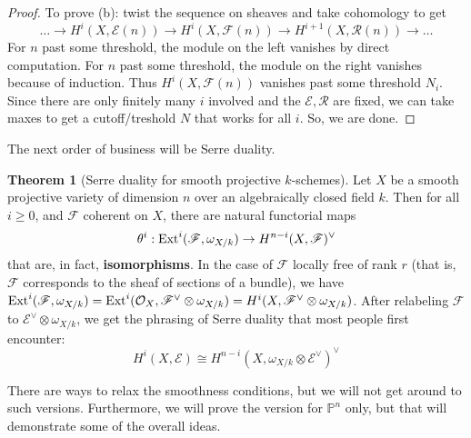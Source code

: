 \documentclass[10pt,reqno]{amsart}
\theoremstyle{definition}
\newtheorem{theorem}{Theorem}
\theoremstyle{remark}
\numberwithin{equation}{section}
\numberwithin{theorem}{section}
\newcommand{\OO}{{\mathcal O}}
\newcommand{\Ext}{\textup{Ext}}
\newcommand{\FF}{{\mathscr F}}
\newcommand{\EE}{{\mathscr E}}
\newcommand{\RR}{{\mathscr R}}
\newcommand{\PP}{{\mathbb P}}
\begin{document}
\begin{proof}
To prove (b): twist the sequence on sheaves and take cohomology to get
\[\dots \to H^i(X,\EE(n)) \to H^i(X,\FF(n)) \to H^{i+1}(X,\RR(n)) \to \dots\]
For $n$ past some threshold, the module on the left vanishes by direct computation. For $n$ past some threshold, the module on the right vanishes because of induction. Thus $H^i(X,\FF(n))$ vanishes past some threshold $N_i$. Since there are only finitely many $i$ involved and the $\EE,\RR$ are fixed, we can take maxes to get a cutoff/treshold $N$ that works for all $i$. So, we are done.
\end{proof}

The next order of business will be Serre duality.

\begin{theorem}[Serre duality for smooth projective $k$-schemes] Let $X$ be a smooth projective variety of dimension $n$ over an algebraically closed field $k$. Then for all $i \ge 0$, and $\FF$ coherent on $X$, there are natural functorial maps
\[\theta^i: \Ext^i(\FF,\omega_{X/k}) \to H^{n-i}(X,\FF)^{\vee}\]
that are, in fact, \textbf{isomorphisms}. In the case of $\FF$ locally free of rank $r$ (that is, $\FF$ corresponds to the sheaf of sections of a bundle), we have $\Ext^i(\FF,\omega_{X/k}) = \Ext^i(\OO_X, \FF^{\vee} \otimes \omega_{X/k}) = H^i(X, \FF^{\vee} \otimes \omega_{X/k})$. After relabeling $\FF$ to $\EE^{\vee} \otimes \omega_{X/k}$, we get the phrasing of Serre duality that most people first encounter:
\[H^i(X,\EE) \cong H^{n-i}(X,\omega_{X/k} \otimes \EE^{\vee})^{\vee}\]
\end{theorem}

There are ways to relax the smoothness conditions, but we will not get around to such versions. Furthermore, we will prove the version for $\PP^n$ only, but that will demonstrate some of the overall ideas. 
\end{document}
